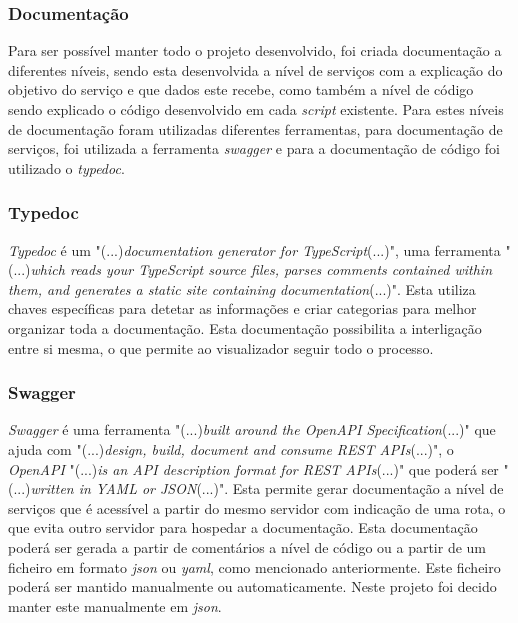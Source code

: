 \subsubsection{Documentação}
Para ser possível manter todo o projeto desenvolvido, foi criada documentação a diferentes níveis, sendo esta desenvolvida a nível de serviços com a explicação do objetivo do serviço e que dados este recebe, como também a nível de código sendo explicado o código desenvolvido em cada \textit{script} existente. Para estes níveis de documentação foram utilizadas diferentes ferramentas, para documentação de serviços, foi utilizada a ferramenta \textit{swagger} e para a documentação de código foi utilizado o \textit{typedoc}.

\subsubsection{Typedoc}

\textit{Typedoc} é um "(...)\emph{documentation generator for TypeScript}(...)"\citep{typedoc}, uma ferramenta "(...)\emph{which reads your TypeScript source files, parses comments contained within them, and generates a static site containing documentation}(...)"\citep{typedoc}. Esta utiliza chaves específicas para detetar as informações e criar categorias para melhor organizar toda a documentação. Esta documentação possibilita a interligação entre si mesma, o que permite ao visualizador seguir todo o processo.

\subsubsection{Swagger}

\textit{Swagger} é uma ferramenta "(...)\emph{built around the OpenAPI Specification}(...)"\citep{swagger} que ajuda com "(...)\emph{design, build, document and consume REST APIs}(...)"\citep{swagger}, o \emph{OpenAPI} "(...)\emph{is an API description format for REST APIs}(...)"\citep{swagger} que poderá ser "(...)\emph{written in YAML or JSON}(...)"\citep{swagger}. Esta permite gerar documentação a nível de serviços que é acessível a partir do mesmo servidor com indicação de uma rota, o que evita outro servidor para hospedar a documentação. Esta documentação poderá ser gerada a partir de comentários a nível de código ou a partir de um ficheiro em formato \textit{\acrshort{json}} ou \textit{\acrshort{yaml}}, como mencionado anteriormente. Este ficheiro poderá ser mantido manualmente ou automaticamente. Neste projeto foi decido manter este manualmente em \textit{\acrshort{json}}.